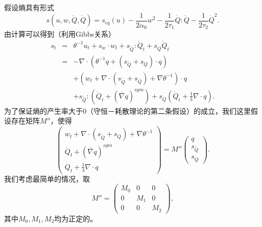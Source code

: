假设熵具有形式
\begin{equation*}
s(u,{w},\mathring{{Q}},\dot{Q})=s_{eq}(u)-\frac{1}{2 \alpha_0}{w}^2-\frac{1}{2\tau_1} {\mathring{{Q}}}:{\mathring{{Q}}}-\frac{1}{2\tau_2}\dot{Q}^2.
\end{equation*}
由计算可以得到（利用Gibbs关系）
\begin{eqnarray*}
s_t &=& \theta^{-1} u_t +s_{w} \cdot {w}_t + s_{\mathring{{Q}}}:\mathring{{Q}}_t+s_{\dot{Q}} \dot{Q}_t \\
    &=& -\nabla \cdot (\theta^{-1} {q}+ (s_{\mathring{{Q}}}+s_{\dot{Q}}) \cdot {q})\\
    	&&+({w}_t+\nabla \cdot (s_{\mathring{{Q}}}+s_{\dot{Q}})+\nabla \theta^{-1}) \cdot {q} \\
&& +s_{\mathring{{Q}}}:(\mathring{{Q}}_t+(\mathring{\nabla {q}})^{sym})+s_{\dot{Q}}(\dot{Q}_t+\frac{1}{3}\nabla \cdot {q}).
\end{eqnarray*}
为了保证熵的产生率大于0（守恒－耗散理论的第二条假设）的成立，我们这里假设存在矩阵$M''$，使得
\begin{equation*}
\left( \begin{array}{ll} {w}_t+\nabla \cdot (s_{\mathring{{Q}}}+s_Q)+\nabla \theta^{-1} \\ \mathring{{Q}}_t+(\mathring{\nabla {q}})^{sym} \\ \dot{Q}_t+\frac{1}{3} \nabla \cdot {q} \end{array} \right) = M'' \left( \begin{array}{l} {q} \\ s_{\mathring{{Q}}} \\s_{\dot{Q}} \end{array} \right).
\end{equation*}
我们考虑最简单的情况，取
\begin{equation*}
	M''=\left( \begin{array}{lll} M_0 & 0 & 0 \\0 & M_1 & 0 \\0 & 0 & M_2 \end{array} \right),
\end{equation*}
其中$M_0,M_1,M_2$均为正定的。

